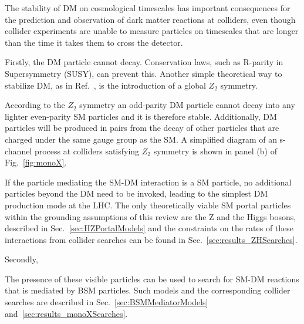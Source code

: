 The stability of DM on cosmological timescales has important consequences for the prediction and observation of dark matter reactions at colliders, even though collider experiments are unable to measure particles on timescales that are longer than the time it takes them to cross the detector. 

\begin{marginnote}[]
\end{marginnote}

Firstly, the DM particle cannot decay. Conservation laws, such as R-parity in Supersymmetry (SUSY), can prevent this. Another simple theoretical way to stabilize DM, as in Ref.~\cite{Batell:2010bp}, is the introduction of a global $Z_2$ symmetry. 
\begin{marginnote}[]
\end{marginnote}
According to the $Z_2$ symmetry an odd-parity DM particle cannot decay into any lighter even-parity SM particles and it is therefore stable. 
Additionally, DM particles will be produced in pairs from the decay of other particles that are charged under the same gauge group as the SM.
A simplified diagram of an s-channel process at colliders satisfying $Z_2$ symmetry is shown in panel (b) of Fig.~\ref{fig:monoX}.


If the particle mediating the SM-DM interaction is a SM particle, no additional particles beyond the DM need to be invoked, leading to the simplest DM production mode at the LHC. The only theoretically viable SM portal particles within the grounding assumptions of this review are the Z and the Higgs bosons, described in Sec.~\ref{sec:HZPortalModels} and the constraints on the rates of these interactions from collider searches can be found in Sec.~\ref{sec:results_ZHSearches}. 

Secondly, 

The presence of these visible particles can be used to search for SM-DM reactions that is mediated by BSM particles. Such models and the corresponding collider searches are described in Sec.~\ref{sec:BSMMediatorModels} and~\ref{sec:results_monoXSearches}. 

